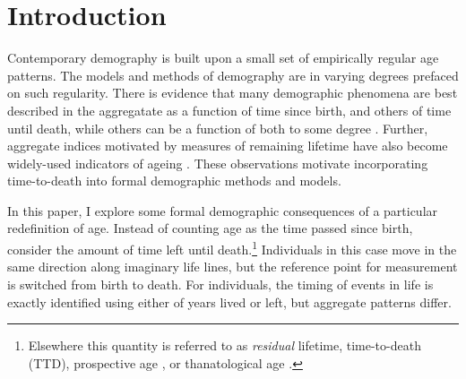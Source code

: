 \documentclass[12pt,oneside,a4paper,leqno]{article}
\begin{document}
\section*{Introduction}
Contemporary demography is built upon a small set of empirically regular age
patterns. The models and methods
of demography are in varying degrees prefaced on such regularity. There is evidence that many demographic phenomena are best described in the
aggregatate as a function of time since birth, and others of time until death,
while others can be a function of both to some degree
\citep{riffe2015ttd,wolf2015disability}. Further, aggregate indices
motivated by measures of remaining lifetime have also become widely-used
indicators of ageing \citep{sanderson2007new}. These observations motivate
incorporating time-to-death into formal demographic methods and models.

In this paper, I explore some formal demographic consequences of a particular
redefinition of age. Instead of counting age as the time passed since birth,
consider the amount of time left until death.\footnote{Elsewhere this quantity
is referred to as \textit{residual} lifetime, time-to-death (TTD), prospective
age \citep{sanderson2007new}, or thanatological age \citep{riffe2015force}.}
Individuals in this case move in the same direction along imaginary life lines,
but the reference point for measurement is switched from birth to death. For
individuals, the timing of events in life is exactly identified using either of
years lived or left, but aggregate patterns differ.
\end{document}
